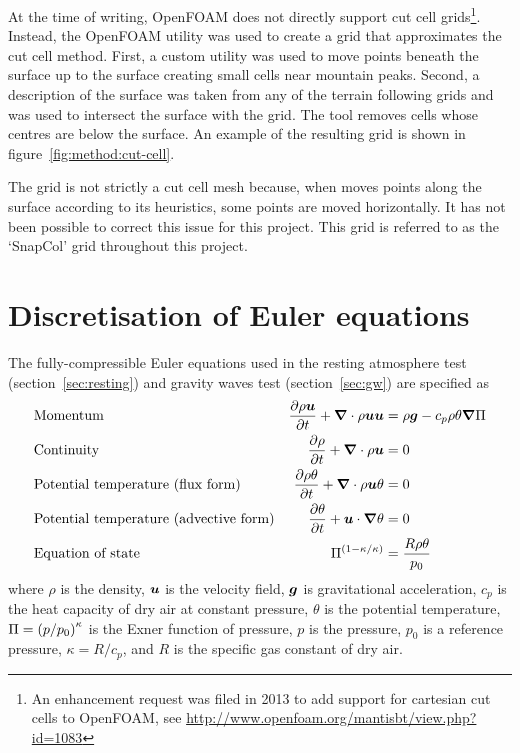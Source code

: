 At the time of writing, OpenFOAM does not directly support cut cell grids\footnote{An enhancement request was filed in 2013 to add support for cartesian cut cells to OpenFOAM, see \url{http://www.openfoam.org/mantisbt/view.php?id=1083}}.  Instead, the  OpenFOAM utility was used to create a grid that approximates the cut cell method.  First, a custom utility was used to move points beneath the surface up to the surface creating small cells near mountain peaks.  Second, a description of the surface was taken from any of the terrain following grids and  was used to intersect the surface with the grid.  The tool removes cells whose centres are below the surface.  An example of the resulting grid is shown in figure~\ref{fig:method:cut-cell}.

The grid is not strictly a cut cell mesh because, when  moves points along the surface according to its heuristics, some points are moved horizontally.  It has not been possible to correct this issue for this project.  This grid is referred to as the `SnapCol' grid throughout this project.


\section{Discretisation of Euler equations}
\label{sec:method:discretisation}

The fully-compressible Euler equations used in the resting atmosphere test (section~\ref{sec:resting}) and gravity waves test (section~\ref{sec:gw}) are specified as
\begin{align}
& \text{Momentum} & \frac{\partial \rho \vect{u}}{\partial t} + \del \cdot \rho \vect{u} \vect{u} &= \rho \vect{g} - c_p \rho \theta \del \exner \label{eqn:method:momentum} \\
%
& \text{Continuity} & \frac{\partial \rho}{\partial t} + \del \cdot \rho \vect{u} &= 0 \label{eqn:method:continuity} \\
%
& \text{Potential temperature (flux form)} & \frac{\partial \rho \theta}{\partial t} + \del \cdot \rho \vect{u} \theta &= 0 \\
%
& \text{Potential temperature (advective form)} & \frac{\partial \theta}{\partial t} + \vect{u} \cdot \del \theta &= 0 \\
%
& \text{Equation of state} & \exner^{(1 - \kappa / \kappa)} &= \frac{R \rho \theta}{p_0}
\end{align}
where $\rho$ is the density, $\bm{u}$ is the velocity field, $\bm{g}$ is gravitational acceleration, $c_p$ is the heat capacity of dry air at constant pressure, $\theta$ is the potential temperature, $\Pi = \left( p / p_0 \right)^\kappa$ is the Exner function of pressure, $p$ is the pressure, $p_0$ is a reference pressure, $\kappa = R/c_p$, and $R$ is the specific gas constant of dry air.


